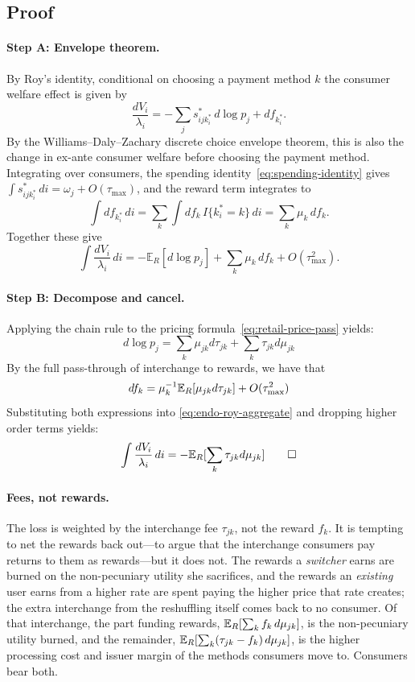 \documentclass[main.tex]{subfiles}
\begin{document}
\subsection{Proof}\label{subsec:endo-proof}

\paragraph{Step A: Envelope theorem.}
By Roy's identity, conditional on choosing a payment method $k$ the consumer welfare effect is given by 
\begin{equation}
    \frac{dV_i}{\lambda_i}=-\sum_j s^*_{ijk^*_i}\,d\log p_j+df_{k^*_i}.
    \label{eq:endo-roy-perconsumer}
\end{equation}
By the Williams--Daly--Zachary discrete choice envelope theorem, this is also the change in ex-ante consumer welfare before choosing the payment method.
Integrating over consumers, the spending identity~\eqref{eq:spending-identity} gives $\int s^*_{ijk^*_i}\,di=\omega_j+O(\tau_{\max})$, and the reward term integrates to
\[
    \int df_{k^*_i}\,di = \sum_k \int df_k \, I\{k^*_i=k\}\,di=\sum_k\mu_k\,df_k.
\]
Together these give
\begin{equation}
\int\frac{dV_i}{\lambda_i}\,di=-\mathbb{E}_R[d\log p_j]+\sum_k\mu_k\,df_k+O(\tau_{\max}^2).
\label{eq:endo-roy-aggregate}
\end{equation}

\paragraph{Step B: Decompose and cancel.}
Applying the chain rule to the pricing formula~\eqref{eq:retail-price-pass} yields:
\begin{equation}
    d\log p_j = \sum_k \mu_{jk} d\tau_{jk} + \sum_k \tau_{jk} d\mu_{jk}
\end{equation}
By the full pass-through of interchange to rewards, we have that
\[
    df_k = \mu_k^{-1} \mathbb{E}_R[\mu_{jk} d\tau_{jk}] + O(\tau_{\max}^2)
\]
Substituting both expressions into \eqref{eq:endo-roy-aggregate} and dropping higher order terms yields:
\begin{equation}
    \int\frac{dV_i}{\lambda_i}\,di = -\mathbb{E}_R[\sum_k \tau_{jk} d\mu_{jk}] \qed
\end{equation}

\paragraph{Fees, not rewards.}
The loss is weighted by the interchange fee $\tau_{jk}$, not the reward $f_k$.
It is tempting to net the rewards back out---to argue that the interchange consumers pay returns to them as rewards---but it does not.
The rewards a \emph{switcher} earns are burned on the non-pecuniary utility she sacrifices, and the rewards an \emph{existing} user earns from a higher rate are spent paying the higher price that rate creates; the extra interchange from the reshuffling itself comes back to no consumer.
Of that interchange, the part funding rewards, $\mathbb{E}_R[\sum_k f_k\,d\mu_{jk}]$, is the non-pecuniary utility burned, and the remainder, $\mathbb{E}_R[\sum_k(\tau_{jk}-f_k)\,d\mu_{jk}]$, is the higher processing cost and issuer margin of the methods consumers move to. Consumers bear both.
\end{document}
